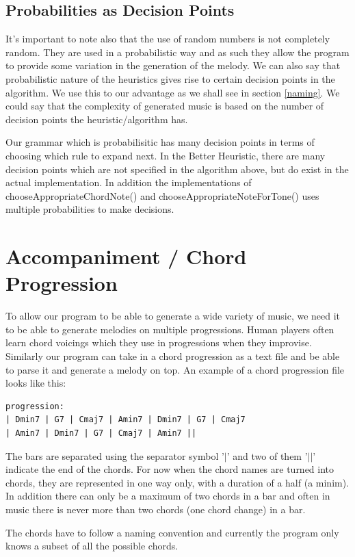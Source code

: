 \documentclass[pdftex,12pt,a4paper]{report}
\begin{document}
\subsection{Probabilities as Decision Points} \label{decisionpoints}
It's important to note also that the use of random numbers is not completely random. They are used in a probabilistic way and as such they allow the program to provide some variation in the generation of the melody. We can also say that probabilistic nature of the heuristics gives rise to certain decision points in the algorithm. We use this to our advantage as we shall see in section \ref{naming}. We could say that the complexity of generated music is based on the number of decision points the heuristic/algorithm has. 

Our grammar which is probabilisitic has many decision points in terms of choosing which rule to expand next. In the Better Heuristic, there are many decision points which are not specified in the algorithm above, but do exist in the actual implementation. In addition the implementations of chooseAppropriateChordNote() and chooseAppropriateNoteForTone() uses multiple probabilities to make decisions.


\section{Accompaniment / Chord Progression}
To allow our program to be able to generate a wide variety of music, we need it to be able to generate melodies on multiple progressions. Human players often learn chord voicings which they use in progressions when they improvise. Similarly our program can take in a chord progression as a text file and be able to parse it and generate a melody on top. An example of a chord progression file looks like this:

\begin{verbatim}
progression:
| Dmin7 | G7 | Cmaj7 | Amin7 | Dmin7 | G7 | Cmaj7  
| Amin7 | Dmin7 | G7 | Cmaj7 | Amin7 || 
\end{verbatim}

The bars are separated using the separator symbol '$|$' and two of them '$||$' indicate the end of the chords. For now when the chord names are turned into chords, they are represented in one way only, with a duration of a half (a minim). In addition there can only be a maximum of two chords in a bar and often in music there is never more than two chords (one chord change) in a bar.

The chords have to follow a naming convention and currently the program only knows a subset of all the possible chords. 
\end{document}
